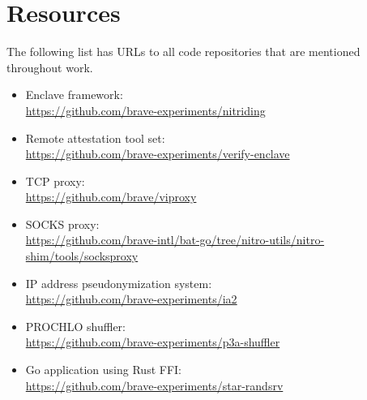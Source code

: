\section*{Resources}

The following list has URLs to all code repositories that are mentioned
throughout work.

\begin{itemize}
  \item Enclave framework:\\
    {\small \url{https://github.com/brave-experiments/nitriding}}

  \item Remote attestation tool set:\\
    {\small \url{https://github.com/brave-experiments/verify-enclave}}

  \item TCP proxy:\\
    {\small \url{https://github.com/brave/viproxy}}

  \item SOCKS proxy:\\
    {\small \url{https://github.com/brave-intl/bat-go/tree/nitro-utils/nitro-shim/tools/socksproxy}}

  \item IP address pseudonymization system:\\
    {\small \url{https://github.com/brave-experiments/ia2}}

  \item PROCHLO shuffler:\\
    {\small \url{https://github.com/brave-experiments/p3a-shuffler}}

  \item Go application using Rust FFI:\\
    {\small \url{https://github.com/brave-experiments/star-randsrv}}

\end{itemize}

